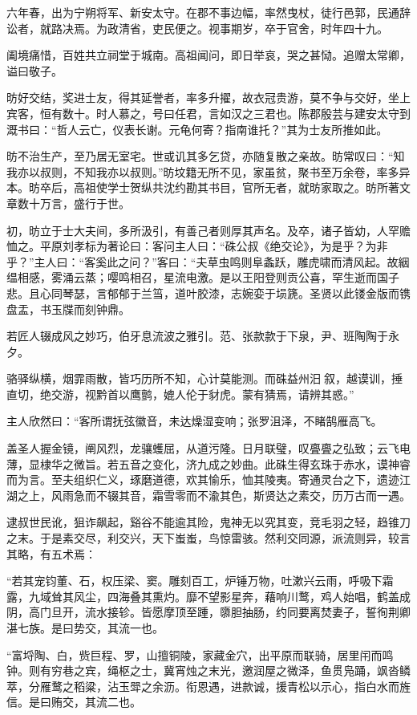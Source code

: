 \documentclass[12pt,UTF8]{ctexbook}
\begin{document}
六年春，出为宁朔将军、新安太守。在郡不事边幅，率然曳杖，徒行邑郭，民通辞讼者，就路决焉。为政清省，吏民便之。视事期岁，卒于官舍，时年四十九。

阖境痛惜，百姓共立祠堂于城南。高祖闻问，即日举哀，哭之甚恸。追赠太常卿，谥曰敬子。

昉好交结，奖进士友，得其延誉者，率多升擢，故衣冠贵游，莫不争与交好，坐上宾客，恒有数十。时人慕之，号曰任君，言如汉之三君也。陈郡殷芸与建安太守到溉书曰：“哲人云亡，仪表长谢。元龟何寄？指南谁托？”其为士友所推如此。

昉不治生产，至乃居无室宅。世或讥其多乞贷，亦随复散之亲故。昉常叹曰：“知我亦以叔则，不知我亦以叔则。”昉坟籍无所不见，家虽贫，聚书至万余卷，率多异本。昉卒后，高祖使学士贺纵共沈约勘其书目，官所无者，就昉家取之。昉所著文章数十万言，盛行于世。

初，昉立于士大夫间，多所汲引，有善己者则厚其声名。及卒，诸子皆幼，人罕赡恤之。平原刘孝标为著论曰：客问主人曰：“硃公叔《绝交论》，为是乎？为非乎？”主人曰：“客奚此之问？”客曰：“夫草虫鸣则阜螽跃，雕虎啸而清风起。故絪缊相感，雾涌云蒸；嘤鸣相召，星流电激。是以王阳登则贡公喜，罕生逝而国子悲。且心同琴瑟，言郁郁于兰筜，道叶胶漆，志婉娈于埙篪。圣贤以此镂金版而镌盘盂，书玉牒而刻钟鼎。

若匠人辍成风之妙巧，伯牙息流波之雅引。范、张款款于下泉，尹、班陶陶于永夕。

骆驿纵横，烟霏雨散，皆巧历所不知，心计莫能测。而硃益州汨叙，越谟训，捶直切，绝交游，视黔首以鹰鹯，媲人伦于豺虎。蒙有猜焉，请辨其惑。”

主人欣然曰：“客所谓抚弦徽音，未达燥湿变响；张罗沮泽，不睹鹄雁高飞。

盖圣人握金镜，阐风烈，龙骧蠖屈，从道污隆。日月联璧，叹亹亹之弘致；云飞电薄，显棣华之微旨。若五音之变化，济九成之妙曲。此硃生得玄珠于赤水，谟神睿而为言。至夫组织仁义，琢磨道德，欢其愉乐，恤其陵夷。寄通灵台之下，遗迹江湖之上，风雨急而不辍其音，霜雪零而不渝其色，斯贤达之素交，历万古而一遇。

逮叔世民讹，狙诈飙起，谿谷不能逾其险，鬼神无以究其变，竞毛羽之轻，趋锥刀之末。于是素交尽，利交兴，天下蚩蚩，鸟惊雷骇。然利交同源，派流则异，较言其略，有五术焉：

“若其宠钧董、石，权压梁、窦。雕刻百工，炉锤万物，吐漱兴云雨，呼吸下霜露，九域耸其风尘，四海叠其熏灼。靡不望影星奔，藉响川鹜，鸡人始唱，鹤盖成阴，高门旦开，流水接轸。皆愿摩顶至踵，隳胆抽肠，约同要离焚妻子，誓徇荆卿湛七族。是曰势交，其流一也。

“富埒陶、白，赀巨程、罗，山擅铜陵，家藏金穴，出平原而联骑，居里闬而鸣钟。则有穷巷之宾，绳枢之士，冀宵烛之末光，邀润屋之微泽，鱼贯凫踊，飒沓鳞萃，分雁鹜之稻粱，沾玉斝之余沥。衔恩遇，进款诚，援青松以示心，指白水而旌信。是曰贿交，其流二也。
\end{document}
